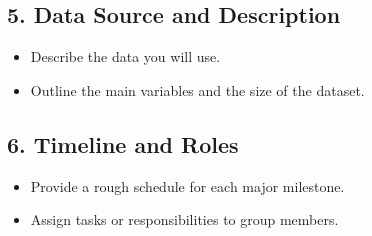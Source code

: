 \documentclass[12pt]{article}
\begin{document}
\subsection*{5. Data Source and Description}
\begin{itemize}
    \item Describe the data you will use.
    \item Outline the main variables and the size of the dataset.
\end{itemize}

\subsection*{6. Timeline and Roles}
\begin{itemize}
    \item Provide a rough schedule for each major milestone.
    \item Assign tasks or responsibilities to group members.
\end{itemize}
\end{document}
